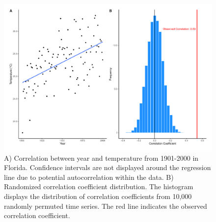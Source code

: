 \documentclass{article}
\begin{document}
\begin{figure}[ht]
    \centering
    \includegraphics[height = 0.6\textwidth]{../results/Florida_plots.pdf}
    \caption{ A) Correlation between year and temperature from 1901-2000 in Florida. Confidence intervals are not displayed around the regression line due to potential autocorrelation within the data. B) Randomized correlation coefficient distribution. The histogram displays the distribution of correlation coefficients from 10,000 randomly permuted time series. The red line indicates the observed correlation coefficient. }
    \label{fig:floridaplots}
\end{figure}
\end{document}
